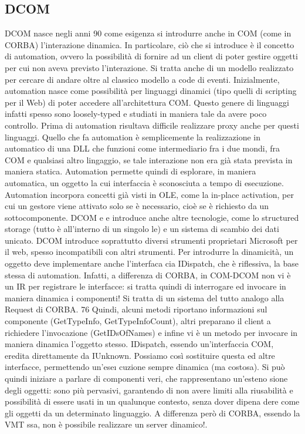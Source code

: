 \subsection{DCOM}
DCOM nasce negli anni 90 come esigenza si introdurre anche in COM (come
in CORBA) l'interazione dinamica. In particolare, ciò che si introduce è il
concetto di automation, ovvero la possibilità di fornire ad un client di poter
gestire oggetti per cui non aveva previsto l'interazione. Si tratta anche di un
modello realizzato per cercare di andare oltre al classico modello a code di eventi.
Inizialmente, automation nasce come possibilità per linguaggi dinamici (tipo
quelli di scripting per il Web) di poter accedere all'architettura COM. Questo
genere di linguaggi infatti spesso sono loosely-typed e studiati in maniera tale
da avere poco controllo. Prima di automation risultava difficile realizzare proxy
anche per questi linguaggi.
Quello che fa automation è semplicemente la realizzazione in automatico di
una DLL che funzioni come intermediario fra i due mondi, fra COM e qualsiasi
altro lingaggio, se tale interazione non era già stata prevista in maniera statica.
Automation permette quindi di esplorare, in maniera automatica, un oggetto
la cui interfaccia è sconosciuta a tempo di esecuzione. Automation incorpora
concetti già visti in OLE, come la in-place activation, per cui un gestore viene
attivato solo se è necessario, cioè se è richiesto da un sottocomponente. DCOM
e e
introduce anche altre tecnologie, come lo structured storage (tutto è all'interno
di un singolo le) e un sistema di scambio dei dati unicato. DCOM introduce
soprattutto diversi strumenti proprietari Microsoft per il web, spesso incompatibili con altri strumenti.
Per introdurre la dinamicità, un oggetto deve implementare anche l'interfaca
cia IDispatch, che è riflessiva, la base stessa di automation. Infatti, a differenza
di CORBA, in COM-DCOM non vi è un IR per registrare le interfacce: si tratta
quindi di interrogare ed invocare in maniera dinamica i componenti! Si tratta
di un sistema del tutto analogo alla Request di CORBA.
76
Quindi, alcuni metodi riportano informazioni sul componente (GetTypeInfo,
GetTypeInfoCount), altri preparano il client a richiedere l'invocazione (GetIDsOfNames) e infine vi è un metodo per
invocare in maniera dinamica l'oggetto
stesso. IDispatch, essendo un'interfaccia COM, eredita direttamente da IUnknown. Possiamo così sostituire questa ed
altre interfacce, permettendo un'ese\i{}
cuzione sempre dinamica (ma costosa).
Si può quindi iniziare a parlare di componenti veri, che rappresentano un'esteno
sione degli oggetti: sono più pervasivi, garantendo di non avere limiti alla riusabilità e possibilità di essere usati
in un qualunque contesto, senza dover dipena
dere come gli oggetti da un determinato linguaggio.
A differenza però di CORBA, essendo la VMT ssa, non è possibile realizzare
un server dinamico!.
